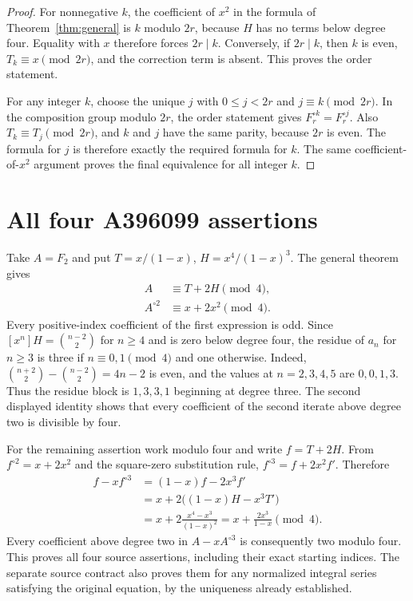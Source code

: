 \documentclass[11pt,a4paper]{article}
\theoremstyle{remark}\newtheorem{remark}[theorem]{Remark}
\begin{document}
\begin{proof}
For nonnegative $k$, the coefficient of $x^2$ in the formula of
Theorem~\ref{thm:general} is $k$ modulo $2r$, because $H$ has
no terms below degree four. Equality with $x$ therefore forces
$2r\mid k$. Conversely, if $2r\mid k$, then $k$ is even,
$T_k\equiv x\pmod{2r}$, and the correction term is absent.
This proves the order statement.

For any integer $k$, choose the unique $j$ with
$0\le j<2r$ and $j\equiv k\pmod{2r}$. In the composition group
modulo $2r$, the order statement gives
$F_r^{\circ k}=F_r^{\circ j}$. Also $T_k\equiv T_j\pmod{2r}$,
and $k$ and $j$ have the same parity, because $2r$ is even.
The formula for $j$ is therefore exactly the required formula for
$k$. The same coefficient-of-$x^2$ argument proves the final
equivalence for all integer $k$.
\end{proof}


\section{All four A396099 assertions}
Take $A=F_2$ and put $T=x/(1-x)$, $H=x^4/(1-x)^3$.
The general theorem gives
\begin{align*}
A&\equiv T+2H\pmod4,\\
A^{\circ2}&\equiv x+2x^2\pmod4.
\end{align*}
Every positive-index coefficient of the first expression is odd. Since
$[x^n]H=\binom{n-2}{2}$ for $n\ge4$ and is zero below degree four,
the residue of $a_n$ for $n\ge3$ is three if $n\equiv0,1\pmod4$
and one otherwise. Indeed,
$\binom{n+2}{2}-\binom{n-2}{2}=4n-2$ is even, and the values at
$n=2,3,4,5$ are $0,0,1,3$. Thus the residue block is
$1,3,3,1$ beginning at degree three. The second displayed identity
shows that every coefficient of the second iterate above degree two
is divisible by four.

For the remaining assertion work modulo four and write $f=T+2H$.
From $f^{\circ2}=x+2x^2$ and the square-zero substitution rule,
$f^{\circ3}=f+2x^2f'$. Therefore
\begin{align*}
f-xf^{\circ3}
&=(1-x)f-2x^3f'\\
&=x+2\bigl((1-x)H-x^3T'\bigr)\\
&=x+2\frac{x^4-x^3}{(1-x)^2}
=x+\frac{2x^3}{1-x}\pmod4.
\end{align*}
Every coefficient above degree two in $A-xA^{\circ3}$ is consequently
two modulo four. This proves all four source assertions, including
their exact starting indices. The separate source contract also proves
them for any normalized integral series satisfying the original equation,
by the uniqueness already established.
\end{document}
